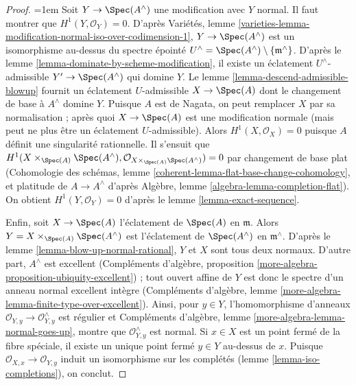 \begin{proof} \begingroup\emergencystretch=1em
Soit $Y \to \Spec(A^\wedge)$ une modification avec $Y$ normal. Il faut montrer que $H^1(Y, \mathcal{O}_Y) = 0$. D'après Variétés, lemme \ref{varieties-lemma-modification-normal-iso-over-codimension-1}, $Y \to \Spec(A^\wedge)$ est un isomorphisme au-dessus du spectre épointé $U^\wedge = \Spec(A^\wedge) \setminus \{\mathfrak m^\wedge\}$. D'après le lemme \ref{lemma-dominate-by-scheme-modification}, il existe un éclatement $U^\wedge$-admissible $Y' \to \Spec(A^\wedge)$ qui domine $Y$. Le lemme \ref{lemma-descend-admissible-blowup} fournit un éclatement $U$-admissible $X \to \Spec(A)$ dont le changement de base à $A^\wedge$ domine $Y$. Puisque $A$ est de Nagata, on peut remplacer $X$ par sa normalisation ; après quoi $X \to \Spec(A)$ est une modification normale (mais peut ne plus être un éclatement $U$-admissible). Alors $H^1(X, \mathcal{O}_X) = 0$ puisque $A$ définit une singularité rationnelle. Il s'ensuit que $H^1(X \times_{\Spec(A)} \Spec(A^\wedge),
\mathcal{O}_{X \times_{\Spec(A)} \Spec(A^\wedge)}) = 0$ par changement de base plat (Cohomologie des schémas, lemme \ref{coherent-lemma-flat-base-change-cohomology}, et platitude de $A \to A^\wedge$ d'après Algèbre, lemme \ref{algebra-lemma-completion-flat}). On obtient $H^1(Y, \mathcal{O}_Y) = 0$ d'après le lemme \ref{lemma-exact-sequence}.\par\endgroup

\medskip\noindent Enfin, soit $X \to \Spec(A)$ l'éclatement de $\Spec(A)$ en $\mathfrak m$. Alors $Y = X \times_{\Spec(A)} \Spec(A^\wedge)$ est l'éclatement de $\Spec(A^\wedge)$ en $\mathfrak m^\wedge$. D'après le lemme \ref{lemma-blow-up-normal-rational}, $Y$ et $X$ sont tous deux normaux. D'autre part, $A^\wedge$ est excellent (Compléments d'algèbre, proposition \ref{more-algebra-proposition-ubiquity-excellent}) ; tout ouvert affine de $Y$ est donc le spectre d'un anneau normal excellent intègre (Compléments d'algèbre, lemme \ref{more-algebra-lemma-finite-type-over-excellent}). Ainsi, pour $y \in Y$, l'homomorphisme d'anneaux $\mathcal{O}_{Y, y} \to \mathcal{O}_{Y, y}^\wedge$ est régulier et Compléments d'algèbre, lemme \ref{more-algebra-lemma-normal-goes-up}, montre que $\mathcal{O}_{Y, y}^\wedge$ est normal. Si $x \in X$ est un point fermé de la fibre spéciale, il existe un unique point fermé $y \in Y$ au-dessus de $x$. Puisque $\mathcal{O}_{X, x} \to \mathcal{O}_{Y, y}$ induit un isomorphisme sur les complétés (lemme \ref{lemma-iso-completions}), on conclut. \end{proof}

